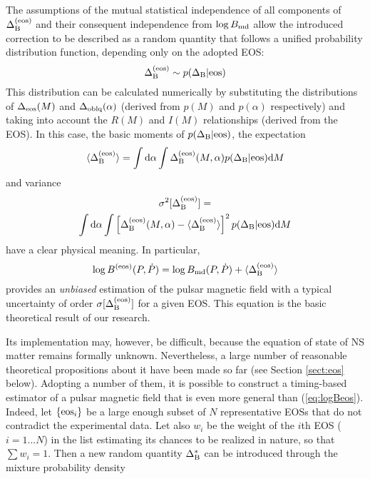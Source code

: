 \documentclass[fleqn,usenatbib]{mnras}
\begin{document}
The assumptions of the mutual statistical independence of all
components of $\Delta^{\rm (eos)}_{\rm B}$ and their consequent independence from
$\log B_{\rm md}$ allow the introduced correction to be described as a random quantity that follows a unified probability distribution function,
depending only on the adopted EOS:
\begin{equation}
    \Delta^{\rm (eos)}_{\rm B} \sim  p(\Delta_{\rm B}\vert{\rm eos})
\end{equation}
This distribution can be calculated numerically by substituting the
distributions of $\Delta_{\rm eos}(M)$ and $\Delta_{\rm oblq}(\alpha)$ (derived from $p(M)$ and $p(\alpha)$
respectively) and taking into account the $R(M)$ and $I(M)$ relationships (derived from the EOS). In this case, the basic moments of
$p(\Delta_{\rm B}\vert{\rm eos})$, the expectation
\begin{equation}
    \langle \Delta^{\rm (eos)}_{\rm B}\rangle = \int{\rm d}\alpha \int \Delta^{\rm (eos)}_{\rm B}(M, \alpha)  p(\Delta_{\rm B}
\vert{\rm eos}) {\rm d}M
\end{equation}
and variance
\begin{multline}
    \sigma^2[\Delta^{\rm (eos)}_{\rm B}] = \\ \int{\rm d}\alpha \int \left[\Delta^{\rm (eos)}_{\rm B}(M, \alpha) - \langle \Delta^{\rm
(eos)}_{\rm B}\rangle \right ]^2 p(\Delta_{\rm B}\vert{\rm eos}) {\rm d}M
	\label{eq:sigma_eos}
\end{multline}
have a clear physical meaning. In particular,
\begin{equation}
    \log B^{\rm (eos)}(P, \dot P) = \log B_{\rm md}(P, \dot P) + \langle \Delta^{\rm (eos)}_{\rm B}\rangle
    \label{eq:logBeos}
\end{equation}
provides an {\it unbiased}  estimation of the pulsar magnetic field with a
typical uncertainty of order $\sigma[\Delta^{\rm (eos)}_{\rm B}]$ for a given EOS. This equation
is the basic theoretical result of our research. 


Its implementation may, however, be difficult, because the equation of state of NS matter remains formally unknown. Nevertheless,
a large number of reasonable theoretical propositions about it have
been made so far (see Section \ref{sect:eos} below). Adopting a number of
them, it is possible to construct a timing-based estimator of a pulsar magnetic field that is even more general than (\ref{eq:logBeos}). Indeed, let
$\{ {\rm eos}_i\}$ be a large enough subset of $N$ representative EOSs that do
not contradict the experimental data. Let also $w_i$ be the weight of the
$i$th EOS ($i = 1...N$) in the list estimating its chances to be realized
in nature, so that $\sum w_i
= 1$. Then a new random quantity $\Delta^*_{\rm B}$ can be
introduced through the mixture probability density
\end{document}
